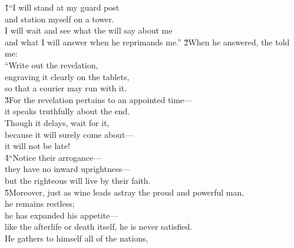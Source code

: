 \begin{poetry}
\poeml {}
\v{1}``I will stand at my guard post \\
\poeml and station myself on a tower. \\
\poeml I will wait and see what the  will say about me \\
\poemll    and what I will answer when he reprimands me.''
\poeml \v{2}When he answered, the  told me: \\
\poeml ``Write out the revelation, \\
\poemll    engraving it clearly on the tablets, \\
\poemlll       so that a courier may run with it. \\
\poeml \v{3}For the revelation pertains to an appointed time--- \\
\poemll    it speaks truthfully about the end. \\
\poeml Though it delays, wait for it, \\
\poemll    because it will surely come about--- \\
\poemlll       it will not be late! \\
\poeml \v{4}``Notice their arrogance--- \\
\poemll    they have no inward uprightness--- \\
\poemlll       but the righteous will live by their faith. \\
\poeml \v{5}Moreover, just as wine leads astray the proud and powerful man, \\
\poemll    he remains restless; \\
\poeml he has expanded his appetite--- \\
\poemll    like the afterlife or death itself, he is never satisfied. \\
\poeml He gathers to himself all of the nations, \\

\end{poetry}
